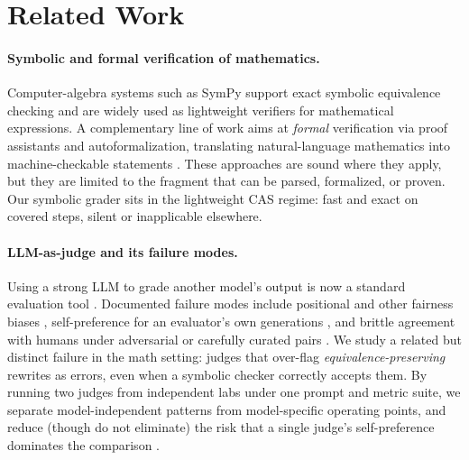 \section{Related Work}
\label{sec:related}

\paragraph{Symbolic and formal verification of mathematics.}
Computer-algebra systems such as SymPy \citep{meurer2017sympy} support exact
symbolic equivalence checking and are widely used as lightweight verifiers for
mathematical expressions. A complementary line of work aims at
\emph{formal} verification via proof assistants and autoformalization, translating
natural-language mathematics into machine-checkable statements
\citep{wu2022autoformalization}. These approaches are sound where they apply,
but they are limited to the fragment that can be parsed, formalized, or proven.
Our symbolic grader sits in the lightweight CAS regime: fast and exact on
covered steps, silent or inapplicable elsewhere.

\paragraph{LLM-as-judge and its failure modes.}
Using a strong LLM to grade another model's output is now a standard evaluation
tool \citep{zheng2023judging,liu2023geval}. Documented failure modes include
positional and other fairness biases \citep{wang2024faireval}, self-preference
for an evaluator's own generations \citep{panickssery2024selfpref}, and brittle
agreement with humans under adversarial or carefully curated pairs
\citep{zeng2024llmbar,thakur2025judging}. We study a related but distinct
failure in the math setting: judges that over-flag \emph{equivalence-preserving}
rewrites as errors, even when a symbolic checker correctly accepts them. By
running two judges from independent labs under one prompt and metric suite, we
separate model-independent patterns from model-specific operating points, and
reduce (though do not eliminate) the risk that a single judge's self-preference
dominates the comparison \citep{panickssery2024selfpref}.

